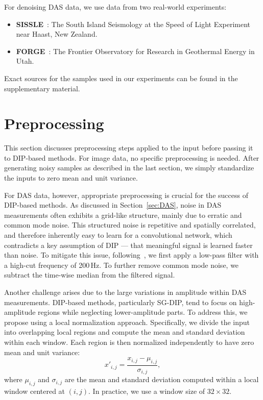 For denoising DAS data, we use data from two real-world experiments:
\begin{itemize}
    \item \textbf{SISSLE}~\cite{SISSLE}: The South Island Seismology at the Speed of Light Experiment near Haast, New Zealand.
    \item \textbf{FORGE}~\cite{FORGE}: The Frontier Observatory for Research in Geothermal Energy in Utah.
\end{itemize}
Exact sources for the samples used in our experiments can be found in the supplementary material.


\section{Preprocessing}

This section discusses preprocessing steps applied to the input before passing it to DIP-based methods.
For image data, no specific preprocessing is needed.
After generating noisy samples as described in the last section, we simply standardize the inputs to zero mean and unit variance.

For DAS data, however, appropriate preprocessing is crucial for the success of DIP-based methods.
As discussed in Section~\ref{sec:DAS}, noise in DAS measurements often exhibits a grid-like structure, mainly due to erratic and common mode noise.
This structured noise is repetitive and spatially correlated, and therefore inherently easy to learn for a convolutional network, which contradicts a key assumption of DIP --- that meaningful signal is learned faster than noise.
To mitigate this issue, following~\cite{IDF}, we first apply a low-pass filter with a high-cut frequency of 200\,Hz.
To further remove common mode noise, we subtract the time-wise median from the filtered signal.

Another challenge arises due to the large variations in amplitude within DAS measurements.
DIP-based methods, particularly SG-DIP, tend to focus on high-amplitude regions while neglecting lower-amplitude parts.
To address this, we propose using a local normalization approach.
Specifically, we divide the input into overlapping local regions and compute the mean and standard deviation within each window.
Each region is then normalized independently to have zero mean and unit variance:
\begin{equation}
    x'_{i,j} = \frac{x_{i,j} - \mu_{i,j}}{\sigma_{i,j}},
\end{equation}
where $\mu_{i,j}$ and $\sigma_{i,j}$ are the mean and standard deviation computed within a local window centered at $(i,j)$.
In practice, we use a window size of $32 \times 32$.

